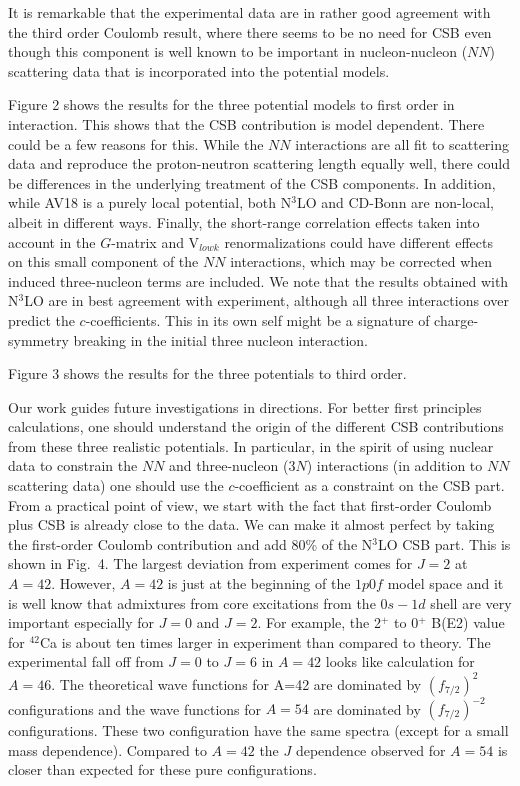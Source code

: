 \documentclass[10pt,showpacs,preprintnumbers,footinbib,amsmath,amssymb,aps,prl,twocolumn,groupedaddress,superscriptaddress,showkeys]{revtex4-1}
\begin{document}
It is remarkable that the experimental data are in
rather good agreement with the third order Coulomb result,
where there seems to be no need for CSB even though this component is
well known to be important in nucleon-nucleon ($NN$) scattering data that is incorporated
into the potential models.

Figure 2 shows the results for the three potential models 
to first order in interaction.  This shows that the CSB contribution is model
dependent.  There could be a few reasons for this. While the $NN$
interactions are all fit to scattering data and reproduce the
proton-neutron scattering length equally well, there could be
differences in the underlying treatment of the CSB components.  In
addition, while AV18 is a purely local potential, both N$^3$LO and
CD-Bonn are non-local, albeit in different ways. Finally, the
short-range correlation effects taken into account in the $G$-matrix and V$_{lowk}$
renormalizations could have different effects on this small component
of the $NN$ interactions, which may be corrected when induced
three-nucleon terms are included.  We note that the results obtained
with N$^3$LO are in best agreement with experiment, although all three
interactions over predict the $c$-coefficients. This in its own self
might be a signature of charge-symmetry breaking in the initial three
nucleon interaction.

Figure 3 shows the results for the three potentials to third order.

Our work guides future investigations in directions.  For better first
principles calculations, one should understand the origin of the
different CSB contributions from these three realistic potentials.  In
particular, in the spirit of using nuclear data to constrain the $NN$
and three-nucleon ($3N$) interactions (in addition to $NN$ scattering data) one should use
the $c$-coefficient as a constraint on the CSB part. From a practical
point of view, we start with the fact that first-order Coulomb
plus CSB is already close to the data.  We can make it almost perfect
by taking the first-order Coulomb contribution and add 80\% of the N$^3$LO
CSB part. This is shown in Fig.~4.  The largest deviation from
experiment comes for $ J=2 $ at $A=42$.  However, $ A=42 $ is just at
the beginning of the $ 1p0f $ model space and it is well know that
admixtures from core excitations from the $0s-1d $ shell are very
important especially for $J=0$ and $J=2$.  For example, the 2$^{ + }$
to 0$^{ + }$ B(E2) value for $^{42}$Ca is about ten times larger in
experiment than compared to theory. The experimental fall off from $J=0 $ 
to $ J=6 $ in $A=42$ looks like calculation for $A=46$. The
theoretical wave functions for A=42 are dominated by $ (f_{7/2})^{2} $
configurations and the wave functions for $ A=54 $ are dominated by $(f_{7/2})^{-2} $ 
configurations. These two configuration have the same
spectra (except for a small mass dependence).  Compared to $ A=42 $
the $ J $ dependence observed for $ A=54 $ is closer than expected for
these pure configurations.
\end{document}

